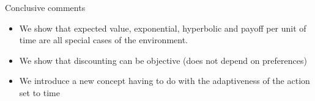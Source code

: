\documentclass{beamer}
\numberwithin{equation}{section}
\begin{document}
\begin{frame}{Conclusive comments }
\begin{itemize}
    \item We show that expected value, exponential, hyperbolic and payoff per unit of time are all special cases of the environment.
    \item We show that discounting can be objective (does not depend on preferences)
    \item We introduce a new concept having to do with the adaptiveness of the action set to time
\end{itemize}
\end{frame}

\begin{frame}

\small{
}
\end{frame}
\end{document}
